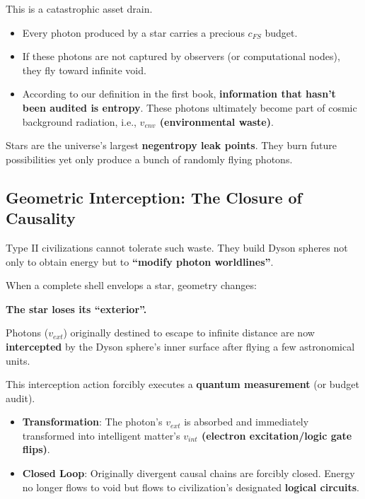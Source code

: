 This is a catastrophic asset drain.

\begin{itemize}
\item Every photon produced by a star carries a precious $c_{FS}$ budget.

\item If these photons are not captured by observers (or computational nodes), they fly toward infinite void.

\item According to our definition in the first book, \textbf{information that hasn't been audited is entropy}. These photons ultimately become part of cosmic background radiation, i.e., \textbf{$v_{env}$ (environmental waste)}.
\end{itemize}

Stars are the universe's largest \textbf{negentropy leak points}. They burn future possibilities yet only produce a bunch of randomly flying photons.

\subsection{Geometric Interception: The Closure of Causality}

Type II civilizations cannot tolerate such waste. They build Dyson spheres not only to obtain energy but to \textbf{``modify photon worldlines''}.

When a complete shell envelops a star, geometry changes:

\textbf{The star loses its ``exterior''.}

Photons ($v_{ext}$) originally destined to escape to infinite distance are now \textbf{intercepted} by the Dyson sphere's inner surface after flying a few astronomical units.

This interception action forcibly executes a \textbf{quantum measurement} (or budget audit).

\begin{itemize}
\item \textbf{Transformation}: The photon's $v_{ext}$ is absorbed and immediately transformed into intelligent matter's \textbf{$v_{int}$ (electron excitation/logic gate flips)}.

\item \textbf{Closed Loop}: Originally divergent causal chains are forcibly closed. Energy no longer flows to void but flows to civilization's designated \textbf{logical circuits}.
\end{itemize}

